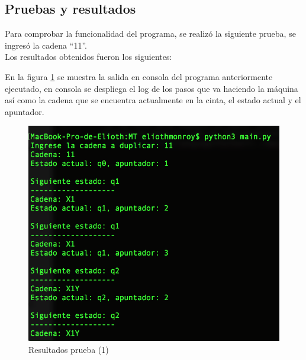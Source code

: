 \subsection{Pruebas y resultados}
	Para comprobar la funcionalidad del programa, se realizó la siguiente prueba, se ingresó la cadena ``11''.\\
	Los resultados obtenidos fueron los siguientes:
	
	En la figura \ref{fig:maquin2} se muestra la salida en consola del programa anteriormente ejecutado, en consola se despliega el log de los pasos que va haciendo la máquina así como la cadena que se encuentra actualmente en la cinta, el estado actual y el apuntador.
	\begin{figure}[H]
		\begin{center}
			\includegraphics[scale=.8]{MT/img/prueba1.png}
			\caption{Resultados prueba (1)}
			\label{fig:maquin2}
		\end{center}
	\end{figure}

